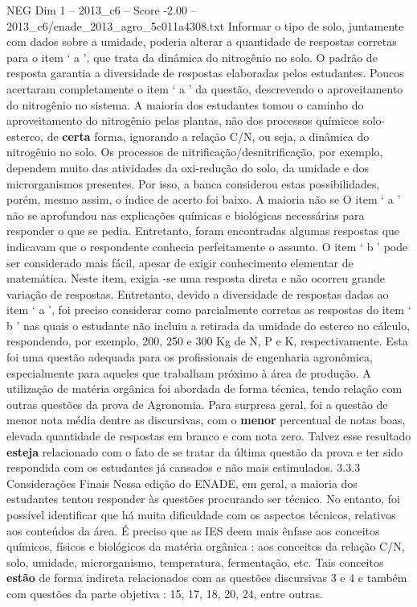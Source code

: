 \begin{textsample}{NEG Dim 1 – 2013\_c6 – Score -2.00 – 2013\_c6/enade\_2013\_agro\_5c011a4308.txt}
Informar o tipo de solo, juntamente com dados sobre a umidade, poderia alterar a quantidade de respostas corretas para o item ‘ a ’, que trata da dinâmica do nitrogênio no solo.
O padrão de resposta garantia a diversidade de respostas elaboradas pelos estudantes.
Poucos acertaram completamente o item ‘ a ’ da questão, descrevendo o aproveitamento do nitrogênio no sistema.
A maioria dos estudantes tomou o caminho do aproveitamento do nitrogênio pelas plantas, não dos processos químicos solo-esterco, de \textbf{certa} forma, ignorando a relação C/N, ou seja, a dinâmica do nitrogênio no solo.
Os processos de nitrificação/desnitrificação, por exemplo, dependem muito das atividades da oxi-redução do solo, da umidade e dos microrganismos presentes.
Por isso, a banca considerou estas possibilidades, porém, mesmo assim, o índice de acerto foi baixo.
A maioria não se O item ‘ a ’ não se aprofundou nas explicações químicas e biológicas necessárias para responder o que se pedia.
Entretanto, foram encontradas algumas respostas que indicavam que o respondente conhecia perfeitamente o assunto.
O item ‘ b ’ pode ser considerado mais fácil, apesar de exigir conhecimento elementar de matemática.
Neste item, exigia -se uma resposta direta e não ocorreu grande variação de respostas.
Entretanto, devido a diversidade de respostas dadas ao item ‘ a ’, foi preciso considerar como parcialmente corretas as respostas do item ‘ b ’ nas quais o estudante não incluiu a retirada da umidade do esterco no cálculo, respondendo, por exemplo, 200, 250 e 300 Kg de N, P e K, respectivamente.
Esta foi uma questão adequada para os profissionais de engenharia agronômica, especialmente para aqueles que trabalham próximo à área de produção.
A utilização de matéria orgânica foi abordada de forma técnica, tendo relação com outras questões da prova de Agronomia.
Para surpresa geral, foi a questão de menor nota média dentre as discursivas, com o \textbf{menor} percentual de notas boas, elevada quantidade de respostas em branco e com nota zero.
Talvez esse resultado \textbf{esteja} relacionado com o fato de se tratar da última questão da prova e ter sido respondida com os estudantes já cansados e não mais estimulados. 3.3.3 Considerações Finais Nessa edição do ENADE, em geral, a maioria dos estudantes tentou responder às questões procurando ser técnico.
No entanto, foi possível identificar que há muita dificuldade com os aspectos técnicos, relativos aos conteúdos da área.
É preciso que as IES deem mais ênfase aos conceitos químicos, físicos e biológicos da matéria orgânica ; aos conceitos da relação C/N, solo, umidade, microrganismo, temperatura, fermentação, etc.
Tais conceitos \textbf{estão} de forma indireta relacionados com as questões discursivas 3 e 4 e também com questões da parte objetiva : 15, 17, 18, 20, 24, entre outras.

\end{textsample}
